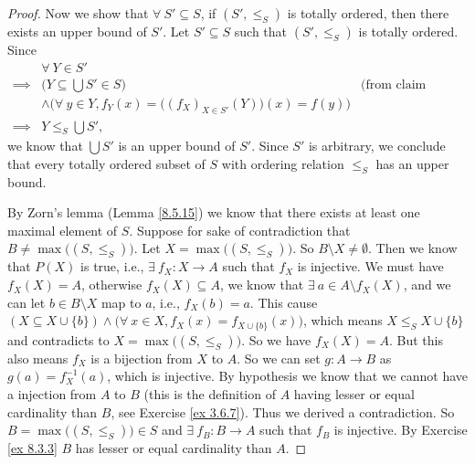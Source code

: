 \begin{proof}
    Now we show that \(\forall\ S' \subseteq S\), if \((S', \leq_S)\) is totally ordered, then there exists an upper bound of \(S'\).
    Let \(S' \subseteq S\) such that \((S', \leq_S)\) is totally ordered.
    Since
    \begin{align*}
                 & \forall\ Y \in S'                                                                                              \\
        \implies & \Big(Y \subseteq \bigcup S' \in S\Big)                                             & \text{(from claim above)} \\
                 & \land \Big(\forall\ y \in Y, f_Y(x) = \big((f_X)_{X \in S'}(Y)\big)(x) = f(y)\Big)                             \\
        \implies & Y \leq_S \bigcup S',
    \end{align*}
    we know that \(\bigcup S'\) is an upper bound of \(S'\).
    Since \(S'\) is arbitrary, we conclude that every totally ordered subset of \(S\) with ordering relation \(\leq_S\) has an upper bound.

    By Zorn's lemma (Lemma \ref{8.5.15}) we know that there exists at least one maximal element of \(S\).
    Suppose for sake of contradiction that \(B \neq \max\big((S, \leq_S)\big)\).
    Let \(X = \max\big((S, \leq_S)\big)\).
    So \(B \setminus X \neq \emptyset\).
    Then we know that \(P(X)\) is true, i.e., \(\exists\ f_X : X \to A\) such that \(f_X\) is injective.
    We must have \(f_X(X) = A\), otherwise \(f_X(X) \subseteq A\), we know that \(\exists\ a \in A \setminus f_X(X)\), and we can let \(b \in B \setminus X\) map to \(a\), i.e., \(f_X(b) = a\).
    This cause \((X \subseteq X \cup \{b\}) \land \big(\forall\ x \in X, f_X(x) = f_{X \cup \{b\}}(x)\big)\), which means \(X \leq_S X \cup \{b\}\) and contradicts to \(X = \max\big((S, \leq_S)\big)\).
    So we have \(f_X(X) = A\).
    But this also means \(f_X\) is a bijection from \(X\) to \(A\).
    So we can set \(g : A \to B\) as \(g(a) = f_X^{-1}(a)\), which is injective.
    By hypothesis we know that we cannot have a injection from \(A\) to \(B\) (this is the definition of \(A\) having lesser or equal cardinality than \(B\), see Exercise \ref{ex 3.6.7}).
    Thus we derived a contradiction.
    So \(B = \max\big((S, \leq_S)\big) \in S\) and \(\exists\ f_B : B \to A\) such that \(f_B\) is injective.
    By Exercise \ref{ex 8.3.3} \(B\) has lesser or equal cardinality than \(A\).
\end{proof}

